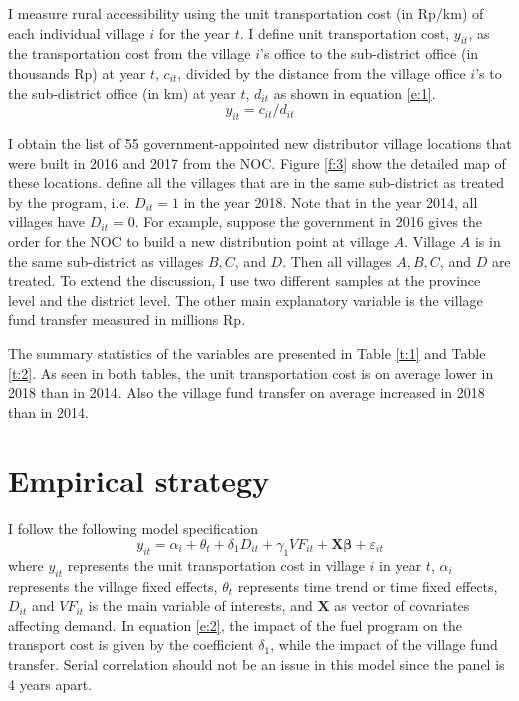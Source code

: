 \documentclass[letterpaper,12pt,leqno]{article}
\begin{document}
I measure rural accessibility using the unit transportation cost (in Rp/km) of each individual village $i$ for the year $t$. I define unit transportation cost, $y_{it}$, as the transportation cost from the village $i$'s office to the sub-district office (in thousands Rp) at year $t$, $c_{it}$, divided by the distance from the village office $i$'s to the sub-district office (in km) at year $t$, $d_{it}$ as shown in equation \eqref{e:1}.
\begin{equation}
        y_{it}=c_{it}/d_{it}\label{e:1}
\end{equation}

I obtain the list of 55 government-appointed new distributor village locations that were built in 2016 and 2017 from the NOC. Figure \ref{f:3} show the detailed map of these locations. define all the villages that are in the same sub-district as treated by the program, i.e. $D_{it}=1$ in the year 2018. Note that in the year 2014, all villages have $D_{it}=0$. For example, suppose the government in 2016 gives the order for the NOC to build a new distribution point at village $A$. Village $A$ is in the same sub-district as villages $B,C$, and $D$. Then all villages $A,B,C$, and $D$ are treated. To extend the discussion, I use two different samples at the province level and the district level. The other main explanatory variable is the village fund transfer measured in millions Rp.

The summary statistics of the variables are presented in Table \ref{t:1} and Table \ref{t:2}. As seen in both tables, the  unit transportation cost is on average lower in 2018 than in 2014. Also the village fund transfer on average increased in 2018 than in 2014.


\section{Empirical strategy}\label{s:strategy}

I follow the following model specification
\begin{equation}
    y_{it}=\alpha_i+\theta_t+\delta_1 D_{it}+\gamma_1 VF_{it}+\textbf{X}\pmb{\beta}+\varepsilon_{it}\label{e:2}
\end{equation}
where $y_{it}$ represents the unit transportation cost in village $i$ in year $t$,
$\alpha_i$ represents the village fixed effects, $\theta_t$ represents time trend or time fixed effects, $D_{it}$ and $VF_{it}$ is the main variable of interests, and $\textbf{X}$ as vector of covariates affecting demand. In equation \eqref{e:2}, the impact of the fuel program on the transport cost is given by the coefficient $\delta_1$, while the impact of the village fund transfer. Serial correlation should not be an issue in this model since the panel is 4 years apart. 
\end{document}

